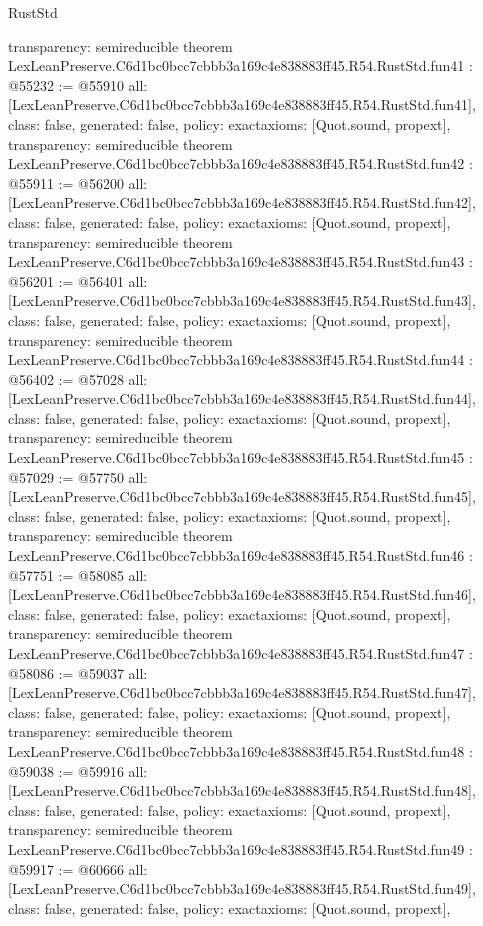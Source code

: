 \begin{lexlean}{RustStd}
\begin{coremodule}
{  transparency: semireducible
}
theorem LexLeanPreserve.C6d1bc0bcc7cbbb3a169c4e838883ff45.R54.RustStd.fun41 : @55232 := @55910 {
  all: [LexLeanPreserve.C6d1bc0bcc7cbbb3a169c4e838883ff45.R54.RustStd.fun41],
  class: false,
  generated: false,
  policy: exact{axioms: [Quot.sound, propext]},
  transparency: semireducible
}
theorem LexLeanPreserve.C6d1bc0bcc7cbbb3a169c4e838883ff45.R54.RustStd.fun42 : @55911 := @56200 {
  all: [LexLeanPreserve.C6d1bc0bcc7cbbb3a169c4e838883ff45.R54.RustStd.fun42],
  class: false,
  generated: false,
  policy: exact{axioms: [Quot.sound, propext]},
  transparency: semireducible
}
theorem LexLeanPreserve.C6d1bc0bcc7cbbb3a169c4e838883ff45.R54.RustStd.fun43 : @56201 := @56401 {
  all: [LexLeanPreserve.C6d1bc0bcc7cbbb3a169c4e838883ff45.R54.RustStd.fun43],
  class: false,
  generated: false,
  policy: exact{axioms: [Quot.sound, propext]},
  transparency: semireducible
}
theorem LexLeanPreserve.C6d1bc0bcc7cbbb3a169c4e838883ff45.R54.RustStd.fun44 : @56402 := @57028 {
  all: [LexLeanPreserve.C6d1bc0bcc7cbbb3a169c4e838883ff45.R54.RustStd.fun44],
  class: false,
  generated: false,
  policy: exact{axioms: [Quot.sound, propext]},
  transparency: semireducible
}
theorem LexLeanPreserve.C6d1bc0bcc7cbbb3a169c4e838883ff45.R54.RustStd.fun45 : @57029 := @57750 {
  all: [LexLeanPreserve.C6d1bc0bcc7cbbb3a169c4e838883ff45.R54.RustStd.fun45],
  class: false,
  generated: false,
  policy: exact{axioms: [Quot.sound, propext]},
  transparency: semireducible
}
theorem LexLeanPreserve.C6d1bc0bcc7cbbb3a169c4e838883ff45.R54.RustStd.fun46 : @57751 := @58085 {
  all: [LexLeanPreserve.C6d1bc0bcc7cbbb3a169c4e838883ff45.R54.RustStd.fun46],
  class: false,
  generated: false,
  policy: exact{axioms: [Quot.sound, propext]},
  transparency: semireducible
}
theorem LexLeanPreserve.C6d1bc0bcc7cbbb3a169c4e838883ff45.R54.RustStd.fun47 : @58086 := @59037 {
  all: [LexLeanPreserve.C6d1bc0bcc7cbbb3a169c4e838883ff45.R54.RustStd.fun47],
  class: false,
  generated: false,
  policy: exact{axioms: [Quot.sound, propext]},
  transparency: semireducible
}
theorem LexLeanPreserve.C6d1bc0bcc7cbbb3a169c4e838883ff45.R54.RustStd.fun48 : @59038 := @59916 {
  all: [LexLeanPreserve.C6d1bc0bcc7cbbb3a169c4e838883ff45.R54.RustStd.fun48],
  class: false,
  generated: false,
  policy: exact{axioms: [Quot.sound, propext]},
  transparency: semireducible
}
theorem LexLeanPreserve.C6d1bc0bcc7cbbb3a169c4e838883ff45.R54.RustStd.fun49 : @59917 := @60666 {
  all: [LexLeanPreserve.C6d1bc0bcc7cbbb3a169c4e838883ff45.R54.RustStd.fun49],
  class: false,
  generated: false,
  policy: exact{axioms: [Quot.sound, propext]},
}
\end{coremodule}
\end{lexlean}
